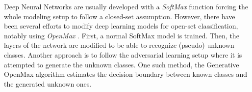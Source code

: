 

Deep Neural Networks are usually developed with a \textit{SoftMax} function forcing the whole modeling setup to follow a closed-set assumption. However, there have been several efforts to modify deep learning models for open-set classification, notably using \textit{OpenMax} \parencite{bendale2016towards,cardoso2017weightless}. First, a normal SoftMax model is trained. Then, the layers of the network are modified to be able to recognize (pseudo) unknown classes. Another approach is to follow the adversarial learning setup where it is attempted to generate the unknown classes. One such method, the Generative OpenMax algorithm \parencite{ge2017generative} estimates the decision boundary between known classes and the generated unknown ones.



